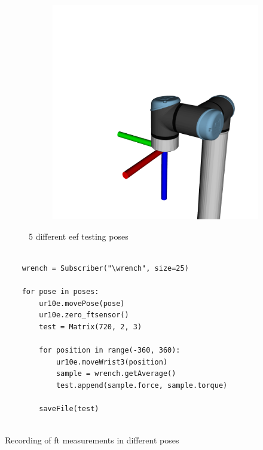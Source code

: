 \begin{figure}[h]
\begin{subfigure}{.195\linewidth}
        \label{fig:eef_p4}
    \end{subfigure}
    \begin{subfigure}{.195\linewidth}
        \centering
        \includegraphics[width=\linewidth]{figs/chp3/P5.png}
        \label{fig:eef_p5}
    \end{subfigure}
    \caption{5 different \ac{eef} testing poses}
    \label{fig:eef_5_position}
\end{figure}

\begin{listing}[h]
    \centering
    \begin{verbatim}

    wrench = Subscriber("\wrench", size=25)
    
    for pose in poses:
        ur10e.movePose(pose)
        ur10e.zero_ftsensor()
        test = Matrix(720, 2, 3)

        for position in range(-360, 360):
            ur10e.moveWrist3(position)
            sample = wrench.getAverage()
            test.append(sample.force, sample.torque)
        
        saveFile(test)   
    
    \end{verbatim}
\caption{Recording of \ac{ft} measurements in different poses}
\label{code:w3_test}
\end{listing}

